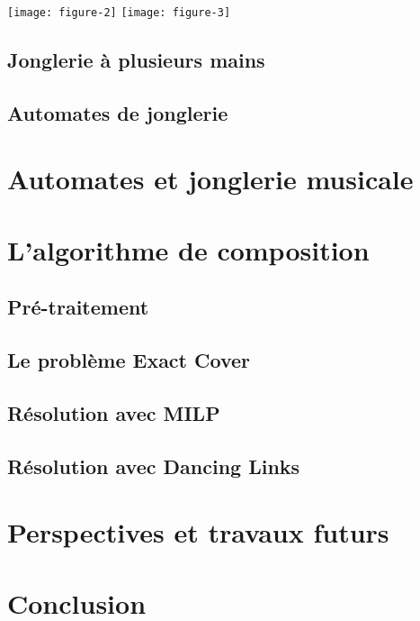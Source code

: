 \documentclass[a4paper]{easychair}
\begin{document}
\texttt{[image: figure-2]}
\texttt{[image: figure-3]}

\subsection{Jonglerie à plusieurs mains}

\subsection{Automates de jonglerie}



\section{Automates et jonglerie musicale}

\section{L'algorithme de composition}
\subsection{Pré-traitement}
\subsection{Le problème Exact Cover}
\subsection{Résolution avec MILP}
\subsection{Résolution avec Dancing Links}

\section{Perspectives et travaux futurs}

\section{Conclusion}
\label{sec:conclusion}



\end{document}
